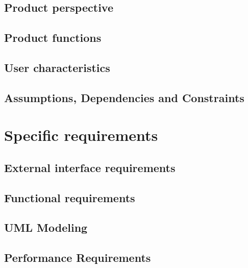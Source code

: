 \documentclass[12pt, a4paper]{report}
\begin{document}
\section{Product perspective}


\section{Product functions}


\section{User characteristics}


\section{Assumptions, Dependencies and Constraints}


%

\chapter{Specific requirements}
\label{ch:requirements}

\section{External interface requirements}


\section{Functional requirements}


\section{UML Modeling}



\section{Performance Requirements}

\end{document}
